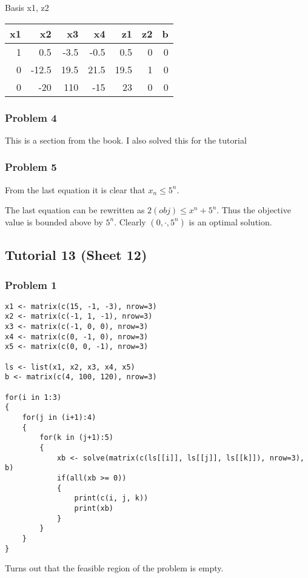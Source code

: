 \documentclass[11pt]{article}
\begin{document}
Basis x1, z2
\begin{center}
\begin{tabular}{rrrrrrr}
x1 & x2 & x3 & x4 & z1 & z2 & b\\
\hline
1 & 0.5 & -3.5 & -0.5 & 0.5 & 0 & 0\\
0 & -12.5 & 19.5 & 21.5 & 19.5 & 1 & 0\\
0 & -20 & 110 & -15 & 23 & 0 & 0\\
\end{tabular}
\end{center}



\subsubsection{Problem 4}
\label{sec:orge3dc701}
This is a section from the book. I also solved this for the tutorial
\subsubsection{Problem 5}
\label{sec:org15cfe42}
From the last equation it is clear that \(x_n \le 5^n\). 

The last equation can be rewritten as \(2(obj) \le x^n + 5^n\). Thus the
objective value is bounded above by \(5^n\). Clearly \((0, \cdot, 5^n)\) is an
optimal solution.
\subsection{Tutorial 13 (Sheet 12)}
\label{sec:orge40416f}
\subsubsection{Problem 1}
\label{sec:org18b68e6}
\begin{verbatim}
x1 <- matrix(c(15, -1, -3), nrow=3)
x2 <- matrix(c(-1, 1, -1), nrow=3)
x3 <- matrix(c(-1, 0, 0), nrow=3)
x4 <- matrix(c(0, -1, 0), nrow=3)
x5 <- matrix(c(0, 0, -1), nrow=3)

ls <- list(x1, x2, x3, x4, x5)
b <- matrix(c(4, 100, 120), nrow=3)

for(i in 1:3)
{
    for(j in (i+1):4)
    {
        for(k in (j+1):5)
        {
            xb <- solve(matrix(c(ls[[i]], ls[[j]], ls[[k]]), nrow=3), b)
            if(all(xb >= 0))
            {
                print(c(i, j, k))
                print(xb)
            }
        }
    }
}
\end{verbatim}

Turns out that the feasible region of the problem is empty.
\end{document}
